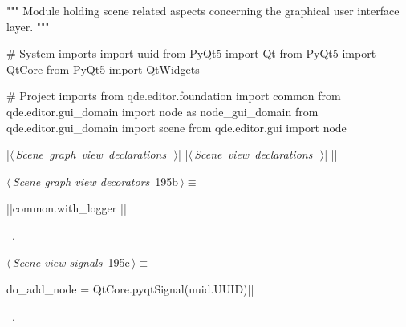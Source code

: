 \documentclass[%
    a4paper,    %
    justified,  %
    nobib,      %
    openany     %
]{tufte-book}
\makeatletter
\renewcommand{\label}[1]{\@tufte@label{##1}}%
\makeatother
\begin{document}
\begin{fullwidth}
\begin{flushleft}
\begin{minipage}{\linewidth}
\begin{pythoncode}
""" Module holding scene related aspects concerning the graphical user interface layer.
"""

# System imports
import uuid
from PyQt5 import Qt
from PyQt5 import QtCore
from PyQt5 import QtWidgets

# Project imports
from qde.editor.foundation import common
from qde.editor.gui_domain import node as node_gui_domain
from qde.editor.gui_domain import scene
from qde.editor.gui import node

|\hbox{$\langle\,${\itshape Scene graph view declarations}\nobreak\ {\footnotesize {}}$\,\rangle$}|
|\hbox{$\langle\,${\itshape Scene view declarations}\nobreak\ {\footnotesize {}}$\,\rangle$}|
|\NWsep|
\end{pythoncode}
\vspace{1.5ex}
\footnotesize
\begin{list}{}{\setlength{\itemsep}{-\parsep}\setlength{\itemindent}{-\leftmargin}}

\item{}
\end{list}
\end{minipage}\vspace{4ex}
\end{flushleft}
\begin{flushleft} \small
\begin{minipage}{\linewidth}\label{scrap184}\raggedright\small
{} $\langle\,${\itshape Scene graph view decorators}\nobreak\ {\footnotesize {195b}}$\,\rangle\equiv$
\vspace{-1ex}
\begin{pythoncode}
|\normalfont{}\fontfamily{}|common.with_logger
|\NWsep|
\end{pythoncode}
\vspace{1.5ex}
\footnotesize
\begin{list}{}{\setlength{\itemsep}{-\parsep}\setlength{\itemindent}{-\leftmargin}}
\item \NWtxtMacroRefIn\ .

\item{}
\end{list}
\end{minipage}\vspace{4ex}
\end{flushleft}
\begin{flushleft} \small
\begin{minipage}{\linewidth}\label{scrap185}\raggedright\small
{} $\langle\,${\itshape Scene view signals}\nobreak\ {\footnotesize {195c}}$\,\rangle\equiv$
\vspace{-1ex}
\begin{pythoncode}
do_add_node = QtCore.pyqtSignal(uuid.UUID)|\NWsep|
\end{pythoncode}
\vspace{1.5ex}
\footnotesize
\begin{list}{}{\setlength{\itemsep}{-\parsep}\setlength{\itemindent}{-\leftmargin}}
\item \NWtxtMacroRefIn\ .


\end{list}
\end{minipage}
\end{flushleft}
\end{fullwidth}
\end{document}
